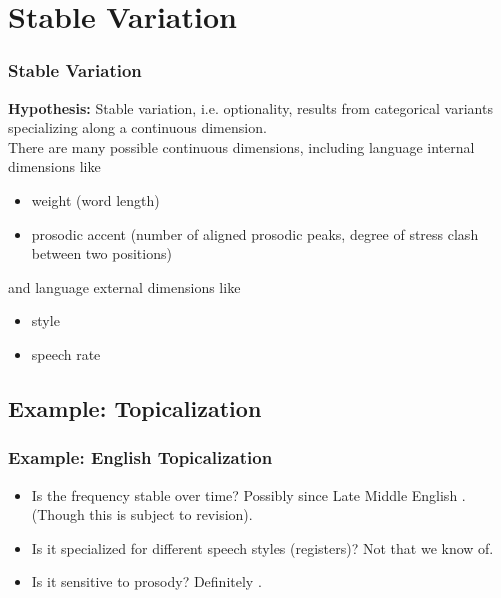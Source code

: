 \documentclass[hyperref={pdfpagelabels=false}]{beamer}
\begin{document}
\section{Stable Variation}
\begin{frame}
\frametitle{Stable Variation}
\textbf{Hypothesis:} Stable variation, i.e. optionality, results from categorical variants specializing along a continuous dimension.\\
\vspace{4mm}
There are many possible continuous dimensions, including language internal dimensions like
	\begin{itemize}
		\item weight (word length)
		\item prosodic accent (number of aligned prosodic peaks, degree of stress clash between two positions)
	\end{itemize}
and language external dimensions like
	\begin{itemize}
		\item style
		\item speech rate
	\end{itemize}
\end{frame}

\subsection{Example: Topicalization}
\begin{frame}
\frametitle{Example: English Topicalization}

\begin{itemize}
	\item Is the frequency stable over time? Possibly since Late Middle English \citep{speyer2010}. (Though this is subject to revision).
	\item Is it specialized for different speech styles (registers)? Not that we know of.
	\item Is it sensitive to prosody? Definitely \citep{speyer2008, speyer2010}.
\end{itemize}
\end{frame}
\end{document}
